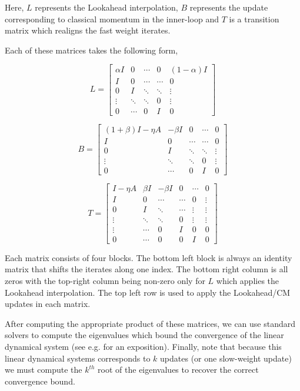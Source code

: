 \documentclass{article}
\begin{document}
Here, $L$ represents the Lookahead interpolation, $B$ represents the update corresponding to classical momentum in the inner-loop and $T$ is a transition matrix which realigns the fast weight iterates.

Each of these matrices takes the following form,

\[ 
L =
\left[\begin{array}{ccccc}
\alpha I & 0 & \cdots & 0  & (1-\alpha) I \\
I & 0 & \cdots & \cdots & 0 \\
0 & I & \ddots &  \ddots & \vdots \\
\vdots & \ddots & \ddots &  0 & \vdots \\
0 & \cdots & 0 & I & 0
\end{array}\right]
\]

\[ 
B =
\left[\begin{array}{ccccc}
(1 + \beta) I - \eta A & -\beta I & 0 & \cdots  & 0 \\
I & 0 & \cdots & \cdots & 0 \\
0 & I & \ddots &\ddots & \vdots \\
\vdots & \ddots & \ddots &  0 & \vdots \\
0 & \cdots & 0 & I & 0
\end{array}\right]
\]

\[ 
T =
\left[\begin{array}{cccccc}
I - \eta A & \beta I & -\beta I & 0 & \cdots & 0 \\
I & 0 & \cdots & \cdots & 0 & \vdots\\
0 & I & \ddots &  \cdots & \vdots & \vdots\\
\vdots & \ddots & \ddots &  0 & \vdots & \vdots \\
\vdots & \cdots & 0 & I & 0 & 0 \\
0 & \cdots & 0 & 0 & I & 0
\end{array}\right]
\]

Each matrix consists of four blocks. The bottom left block is always an identity matrix that shifts the iterates along one index. The bottom right column is all zeros with the top-right column being non-zero only for $L$ which applies the Lookahead interpolation. The top left row is used to apply the Lookahead/CM updates in each matrix.

After computing the appropriate product of these matrices, we can use standard solvers to compute the eigenvalues which bound the convergence of the linear dynamical system (see e.g. \citet{lessard2016analysis} for an exposition). Finally, note that because this linear dynamical systems corresponds to $k$ updates (or one slow-weight update) we must compute the $k^{th}$ root of the eigenvalues to recover the correct convergence bound.
\end{document}
